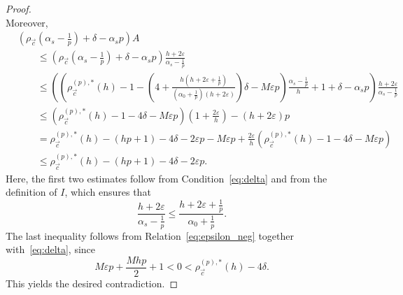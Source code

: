 \documentclass[10pt,a4paper]{amsart}
\begin{document}
\begin{proof}
\[\]
Moreover,
\small
\begin{align*}
&\left(\rho_{\vec{c}}\left(\alpha_s-\frac{1}{p}\right)
+\delta-\alpha_sp\right)A \\
&\qquad \leq
\left(\rho_{\vec{c}}\left(\alpha_s-\frac{1}{p}\right)
+\delta-\alpha_sp\right)
\frac{h+2\varepsilon}{\alpha_s-\frac{1}{p}} \\
&\qquad \leq
\left(
\left(
\rho_{\vec{c}}^{(p),\ast}(h)-1
-\left(
4+
\frac{h\left(h+2\varepsilon+\frac{1}{p}\right)}
{\left(\alpha_0+\frac{1}{p}\right)(h+2\varepsilon)}
\right)\delta
-M\varepsilon p
\right)
\frac{\alpha_s-\frac{1}{p}}{h}
+1+\delta-\alpha_sp
\right)
\frac{h+2\varepsilon}{\alpha_s-\frac{1}{p}} \\
&\qquad \leq
\left(\rho_{\vec{c}}^{(p),\ast}(h)-1-4\delta-M\varepsilon p\right)
\left(1+\frac{2\varepsilon}{h}\right)
-(h+2\varepsilon)p \\
&\qquad =
\rho_{\vec{c}}^{(p),\ast}(h)-(hp+1)-4\delta-2\varepsilon p-M\varepsilon p
+\frac{2\varepsilon}{h}
\left(\rho_{\vec{c}}^{(p),\ast}(h)-1-4\delta-M\varepsilon p\right) \\
&\qquad \leq
\rho_{\vec{c}}^{(p),\ast}(h)-(hp+1)-4\delta-2\varepsilon p.
\end{align*}
\normalsize
Here, the first two estimates follow from Condition~\eqref{eq:delta} and
from the definition of $I$, which ensures that
\[
\frac{h+2\varepsilon}{\alpha_s-\frac{1}{p}}
\leq
\frac{h+2\varepsilon+\frac{1}{p}}
{\alpha_0+\frac{1}{p}}.
\]
The last inequality follows from Relation~\eqref{eq:epsilon_neg} together
with~\eqref{eq:delta}, since
\[
M\varepsilon p+\frac{Mhp}{2}+1
<0<
\rho_{\vec{c}}^{(p),\ast}(h)-4\delta.
\]
This yields the desired contradiction.
\end{proof}
\end{document}
